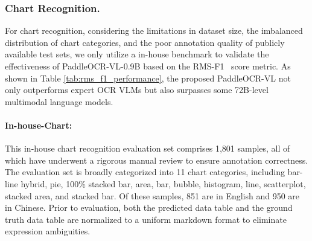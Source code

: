 \documentclass[11pt, a4paper,logo,  copyright, nonumbering]{paddleocr}
\begin{document}
\subsubsection{Chart Recognition.} For chart recognition, considering the limitations in dataset size, the imbalanced distribution of chart categories, and the poor annotation quality of publicly available test sets, we only utilize a in-house benchmark to validate the effectiveness of PaddleOCR-VL-0.9B based on the RMS-F1~\cite{deplot} score metric. As shown in Table \ref{tab:rms_f1_performance}, the proposed PaddleOCR-VL not only outperforms expert OCR VLMs but also surpasses some 72B-level multimodal language models.

\paragraph{In-house-Chart:} This in-house chart recognition evaluation set comprises 1,801 samples, all of which have underwent a rigorous manual review to ensure annotation correctness. The evaluation set is broadly categorized into 11 chart categories, including bar-line hybrid, pie, 100\% stacked bar, area, bar, bubble, histogram, line, scatterplot, stacked area, and stacked bar. Of these samples, 851 are in English and 950 are in Chinese. Prior to evaluation, both the predicted data table and the ground truth data table are normalized to a uniform markdown format to eliminate expression ambiguities.
\end{document}
